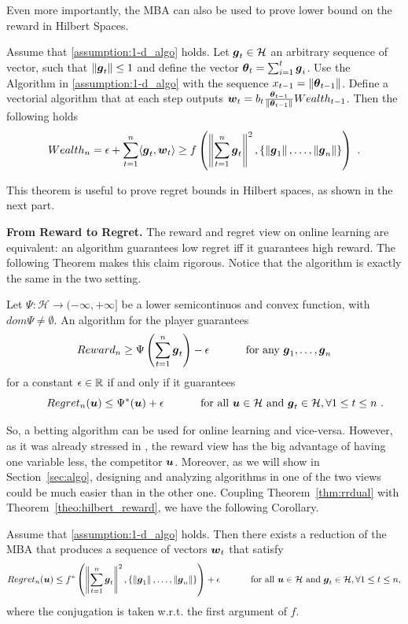 Even more importantly, the \ac{MBA} can also be used to prove lower bound on the reward in Hilbert Spaces.
\begin{theorem}
\label{theo:hilbert_reward}
  Assume that \ref{assumption:1-d_algo} holds.
  Let $\boldsymbol{g}_t \in \mathcal{H}$ an arbitrary sequence of vector, such that $\left\|{\boldsymbol{g}_t}\right\| \leq 1$ and define the vector ${\boldsymbol{\theta}}_t=\sum_{i=1}^{t} \boldsymbol{g}_i$.
  Use the Algorithm in \ref{assumption:1-d_algo} with the sequence $x_{t-1}= \left\|{{\boldsymbol{\theta}}_{t-1}}\right\|$.
  Define a vectorial algorithm that at each step outputs $\boldsymbol{w}_t = b_t \frac{{\boldsymbol{\theta}}_{t-1}}{\left\|{{\boldsymbol{\theta}}_{t-1}}\right\|} Wealth_{t-1}$. Then the following holds
  \[
  Wealth_{n} = \epsilon + \sum_{t=1}^n \langle \boldsymbol{g}_t, \boldsymbol{w}_t \rangle \geq f\left( \left\|{\sum_{t=1}^n \boldsymbol{g}_t}\right\|^2, \left\{\left\|{\boldsymbol{g}_1}\right\|, \ldots, \left\|{\boldsymbol{g}_n}\right\|\right\}\right)~.
  \]
\end{theorem}
This theorem is useful to prove regret bounds in Hilbert spaces, as shown in the next part.

\vspace{0.2cm}\noindent\textbf{From Reward to Regret.}
The reward and regret view on online learning are equivalent: an algorithm guarantees low regret iff it guarantees high reward. The following Theorem makes this claim rigorous. Notice that the algorithm is exactly the same in the two setting.
\begin{theorem}
  \label{thm:rrdual}
  Let $\Psi:\mathcal{H} \rightarrow (-\infty, +\infty]$ be a lower semicontinuos and convex function, with $dom \Psi \neq \emptyset$. An
  algorithm for the player guarantees
  \[
  Reward_n \geq \Psi\left(\sum_{t=1}^n \boldsymbol{g}_t\right) - \epsilon \quad \quad \quad \textnormal{ for any } \boldsymbol{g}_1, \dots, \boldsymbol{g}_n
  \]
  for a constant $\epsilon \in \mathbb{R}$ if and only if it
  guarantees
  \begin{equation}\label{eq:regb}
  \qquad Regret_n(\boldsymbol{u}) \leq \Psi^*(\boldsymbol{u}) + \epsilon \quad \quad \quad \textnormal{ for all } \boldsymbol{u} \in \mathcal{H} \textnormal{ and } \boldsymbol{g}_t \in \mathcal{H}, \forall 1\leq t\leq n~.
  \end{equation}
\end{theorem}
So, a betting algorithm can be used for online learning and vice-versa. However, as it was already stressed in \citet{McMahanO14}, the reward view has the big advantage of having one variable less, the competitor $\boldsymbol{u}$.
Moreover, as we will show in Section~\ref{sec:algo}, designing and analyzing algorithms in one of the two views could be much easier than in the other one.
Coupling Theorem~\ref{thm:rrdual} with Theorem~\ref{theo:hilbert_reward}, we have the following Corollary.
\begin{cor}
\label{theo:hilbert_regret}
Assume that \ref{assumption:1-d_algo} holds. Then there exists a reduction of the \ac{MBA} that produces a sequence of vectors $\boldsymbol{w}_t$ that satisfy
\[
Regret_n(\boldsymbol{u}) \leq f^*\left( \left\|{\sum_{t=1}^{n} \boldsymbol{g}_t}\right\|^2, \left\{\left\|{\boldsymbol{g}_1}\right\|, \ldots, \left\|{\boldsymbol{g}_n}\right\|\right\}\right)+\epsilon \quad \quad \quad \textnormal{ for all } \boldsymbol{u} \in \mathcal{H} \textnormal{ and } \boldsymbol{g}_t \in \mathcal{H}, \forall 1\leq t\leq n,
\]
where the conjugation is taken w.r.t. the first argument of $f$.
\end{cor}

